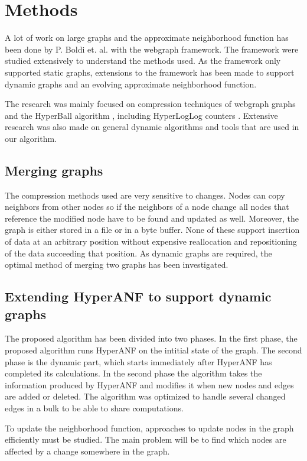 \chapter{Methods}

A lot of work on large graphs and the approximate neighborhood function has been done by P. Boldi et. al. with the webgraph framework\cite{webgraph}. The framework were studied extensively to understand the methods used. As the framework only supported static graphs, extensions to the framework has been made to support dynamic graphs and an evolving approximate neighborhood function. 

The research was mainly focused on compression techniques of webgraph graphs \cite{webgraph-compression} and the HyperBall algorithm \cite{hyperball}, including HyperLogLog counters \cite{hyperloglog}. Extensive research was also made on general dynamic algorithms and tools that are used in our algorithm.


\section{Merging graphs}
The compression methods used are very sensitive to changes. Nodes can copy neighbors from other nodes so if the neighbors of a node change all nodes that reference the modified node have to be found and updated as well. Moreover, the graph is either stored in a file or in a byte buffer. None of these support insertion of data at an arbitrary position without expensive reallocation and repositioning of the data succeeding that position. As dynamic graphs are required, the optimal method of merging two graphs has been investigated. 


\section{Extending HyperANF to support dynamic graphs}
The proposed algorithm has been divided into two phases. In the first phase, the proposed algorithm runs HyperANF on the intitial state of the graph. The second phase is the dynamic part, which starts immediately after HyperANF has completed its calculations. In the second phase the algorithm takes the information produced by HyperANF and modifies it when new nodes and edges are added or deleted. The algorithm was optimized to handle several changed edges in a bulk to be able to share computations.

To update the neighborhood function, approaches to update nodes in the graph efficiently must be studied. The main problem will be to find which nodes are affected by a change somewhere in the graph.


